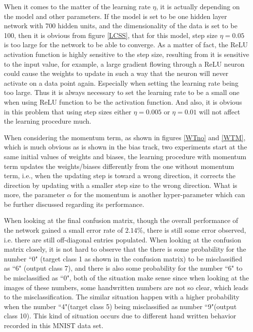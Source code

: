 \documentclass[conference]{IEEEtran}
\begin{document}
When it comes to the matter of the learning rate $\eta$, it is actually depending on the model and other parameters. If the model is set to be one hidden layer network with 700 hidden units, and the dimensionality of the data is set to be 100, then it is obvious from figure \ref{LCSS}, that for this model, step size $\eta = 0.05$ is too large for the network to be able to converge. As a matter of fact, the ReLU activation function is highly sensitive to the step size, resulting from it is sensitive to the input value, for example, a large gradient flowing through a ReLU neuron could cause the weights to update in such a way that the neuron will never activate on a data point again. Especially when setting the learning rate being too large\cite{b5}. Thus it is always necessary to set the learning rate to be a small one when using ReLU function to be the activation function. And also, it is obvious in this problem that using step sizes either $\eta = 0.005$ or $\eta = 0.01$ will not affect the learning procedure much.

When considering the momentum term, as shown in figures \ref{WTno} and \ref{WTM}, which is much obvious as is shown in the bias track, two experiments start at the same initial values of weights and biases, the learning procedure with momentum term updates the weights/biases differently from the one without momentum term, i.e., when the updating step is toward a wrong direction, it corrects the direction by updating with a smaller step size to the wrong direction. What is more, the parameter $\alpha$ for the momentum is another hyper-parameter which can be further discussed regarding its performance.

When looking at the final confusion matrix, though the overall performance of the network gained a small error rate of $2.14\%$, there is still some error observed, i.e. there are still off-diagonal entries populated. When looking at the confusion matrix closely, it is not hard to observe that the there is some probability for the number ``0" (target class 1 as shown in the confusion matrix) to be misclassified as ``6" (output class 7), and there is also some probability for the number ``6" to be misclassified as ``0", both of the situation make sense since when looking at the images of these numbers, some handwritten numbers are not so clear, which leads to the misclassification. The similar situation happen with a higher probability when the number ``4"(target class 5) being misclassified as number ``9"(output class 10). This kind of situation occurs due to different hand written behavior recorded in this MNIST data set.
\end{document}

